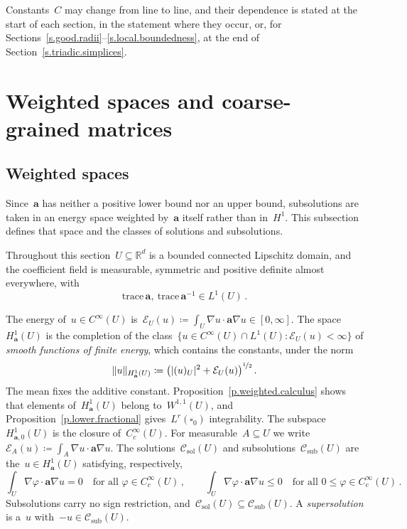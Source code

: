 \documentclass[11pt,letterpaper]{article}
\numberwithin{equation}{section}
\theoremstyle{definition}
\newcommand{\Rd}{\mathbb{R}^d}
\renewcommand{\a}{\mathbf{a}}
\newcommand{\nf}{\nicefrac}
\newcommand{\cu}{\square}
\newcommand*{\tr}{\mathrm{trace\,}}
\DeclarePairedDelimiter{\norm}{\lVert}{\rVert}
\newcommand{\Ener}{\mathcal E}
\newcommand{\Hzero}[1]{H^1_{#1,0}}
\newcommand{\Csol}{\mathcal C_{\mathrm{sol}}}
\newcommand{\Csub}{\mathcal C_{\mathrm{sub}}}
\begin{document}
\smallskip

Constants~$C$ may change from line to line, and their dependence is stated at the start of each section, in the statement where they occur, or, for Sections~\ref{s.good.radii}--\ref{s.local.boundedness}, at the end of Section~\ref{s.triadic.simplices}.

\section{Weighted spaces and coarse-grained matrices}
\label{s.harmonic.matrices}

\subsection{Weighted spaces}
\label{s.weighted.spaces}

Since~$\a$ has neither a positive lower bound nor an upper bound, subsolutions are taken in an energy space weighted by~$\a$ itself rather than in~$H^1$. This subsection defines that space and the classes of solutions and subsolutions.

\smallskip

Throughout this section~$U\subseteq\Rd$ is a bounded connected Lipschitz domain, and the coefficient field is measurable, symmetric and positive definite almost everywhere, with
\begin{equation}
	\tr\a,\ \tr\a^{-1}\in L^1(U)\,.
	\label{e.weighted.hypotheses}
\end{equation}

\smallskip

The energy of~$u\in C^\infty(U)$ is~$\Ener_U(u)\coloneqq\int_U\nabla u\cdot\a\nabla u\in[0,\infty]$. The space~$H^1_\a(U)$ is the completion of the class~$\{u\in C^\infty(U)\cap L^1(U):\Ener_U(u)<\infty\}$ of \emph{smooth functions of finite energy}, which contains the constants, under the norm
\begin{equation}
	\norm{u}_{H^1_\a(U)}\coloneqq\bigl(|(u)_U|^2+\Ener_U(u)\bigr)^{\nf12}\,.
	\label{e.weighted.norm}
\end{equation}
The mean fixes the additive constant. Proposition~\ref{p.weighted.calculus} shows that elements of~$H^1_\a(U)$ belong to~$W^{1,1}(U)$, and Proposition~\ref{p.lower.fractional} gives~$L^r(\cu_0)$ integrability. The subspace~$\Hzero{\a}(U)$ is the closure of~$C^\infty_c(U)$. For measurable~$A\subseteq U$ we write~$\Ener_A(u)\coloneqq\int_A\nabla u\cdot\a\nabla u$. The solutions~$\Csol(U)$ and subsolutions~$\Csub(U)$ are the~$u\in H^1_\a(U)$ satisfying, respectively,
\begin{equation}
	\int_U\nabla\varphi\cdot\a\nabla u=0\quad\mbox{for all }\varphi\in C^\infty_c(U)\,,\qquad
	\int_U\nabla\varphi\cdot\a\nabla u\leq0\quad\mbox{for all }0\leq\varphi\in C^\infty_c(U)\,.
	\label{e.weighted.subsolution}
\end{equation}
Subsolutions carry no sign restriction, and~$\Csol(U)\subseteq\Csub(U)$. A \emph{supersolution} is a~$u$ with~$-u\in\Csub(U)$.
\end{document}
